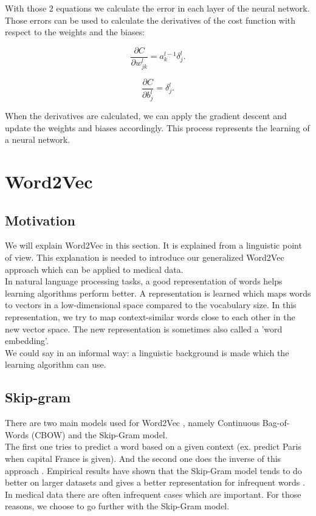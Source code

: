 \noindent With those 2 equations we calculate the error in each layer of the neural network. Those errors can be used to calculate the derivatives of the cost function with respect to the weights and the biases:

\begin{equation} 
\frac{\partial C}{\partial w^l_{jk}} = a^{l-1}_k \delta^l_j.
\end{equation}

\begin{equation} 
\frac{\partial C}{\partial b^l_j} = \delta^l_j.
\end{equation}

\noindent When the derivatives are calculated, we can apply the gradient descent and update the weights and biases accordingly. This process represents the learning of a neural network.


\section{Word2Vec}
\label{sec:word2vec}

\subsection{Motivation}

We will explain Word2Vec in this section. It is explained from a linguistic point of view. This explanation is needed to introduce our generalized Word2Vec approach which can be applied to medical data. \\

In natural language processing tasks, a good representation of words helps learning algorithms perform better. A representation is learned which maps words to vectors in a low-dimensional space compared to the vocabulary size. In this representation, we try to map context-similar words close to each other in the new vector space. The new representation is sometimes also called a 'word embedding'. \\
We could say in an informal way: a linguistic background is made which the learning algorithm can use. 


\subsection{Skip-gram}

There are two main models used for Word2Vec \cite{w2vOriginal:article}, namely Continuous Bag-of-Words (CBOW) and the Skip-Gram model. \\
The first one tries to predict a word based on a given context (ex. predict Paris when capital France is given). And the second one does the inverse of this approach \cite{w2vModels:article}. Empirical results have shown that the Skip-Gram model tends to do better on larger datasets \cite{w2vReason1:online} and gives a better representation for infrequent words \cite{w2vArchive:online}. In medical data there are often infrequent cases which are important. For those reasons, we choose to go further with the Skip-Gram model. \\


